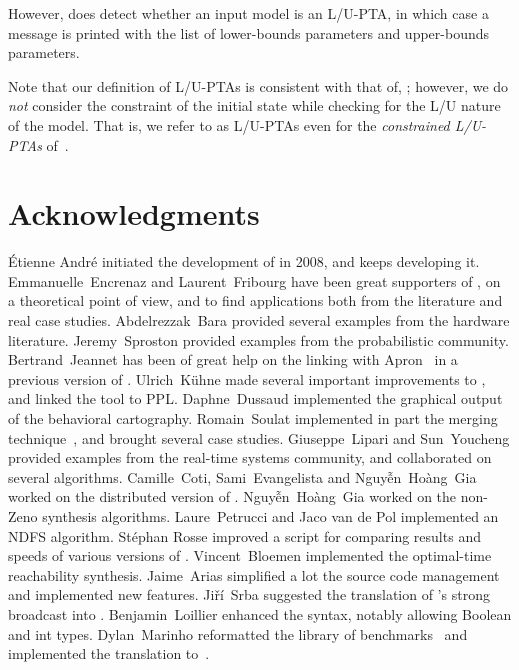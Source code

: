 However, \imitator{} does detect whether an input model is an L/U-PTA, in which case a message is printed with the list of lower-bounds parameters and upper-bounds parameters.

\begin{remark}
	Note that our definition of L/U-PTAs is consistent with that of, \eg{} \cite{BlT09}; however, we do \emph{not} consider the constraint of the initial state while checking for the L/U nature of the model.
	That is, we refer to as L/U-PTAs even for the \emph{constrained L/U-PTAs} of~\cite{BlT09}.
\end{remark}




\chapter{Acknowledgments}

\sloppy
\'Etienne André initiated the development of \imitator{} in 2008, and keeps developing it.
Emmanuelle~Encrenaz and Laurent~Fribourg have been great supporters of \imitator{}, on a theoretical point of view, and to find applications both from the literature and real case studies.
Abdelrezzak~Bara provided several examples from the hardware literature.
Jeremy~Sproston provided examples from the probabilistic community.
Bertrand~Jeannet has been of great help on the linking with Apron~\cite{JM09} in a previous version of \imitator{}.
Ulrich~K\"uhne made several important improvements to \imitator{}, and linked the tool to PPL.
Daphne~Dussaud implemented the graphical output of the behavioral cartography.
Romain~Soulat implemented in part the merging technique~\cite{AFS13atva}, and brought several case studies.
Giuseppe~Lipari and Sun~Youcheng provided examples from the real-time systems community, and collaborated on several algorithms.
Camille~Coti, Sami~Evangelista and Nguy\~{ê}n~Hoàng~Gia worked on the distributed version of \imitator{}.
Nguy\~{ê}n~Hoàng~Gia worked on the non-Zeno synthesis algorithms.
Laure~Petrucci and Jaco van de Pol implemented an NDFS algorithm.
%
Stéphan Rosse improved a script for comparing results and speeds of various versions of \imitator{}.
%
Vincent~Bloemen implemented the optimal-time reachability synthesis.
%
Jaime~Arias simplified a lot the source code management and implemented new features.
%
Jiří~Srba suggested the translation of \imitator{}'s strong broadcast into \uppaal{}.
%
Benjamin~Loillier enhanced the syntax, notably allowing Boolean and int types.
%
Dylan~Marinho reformatted the library of benchmarks~\cite{AMP21} and implemented the translation to~\jani{}.


